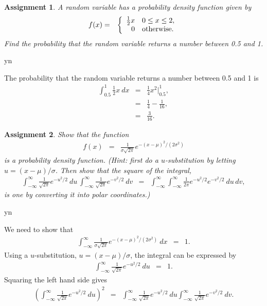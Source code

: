 \documentclass[12pt]{article}
\def\solutions{y}
\def\solutions{n}
\newtheorem{assignment}{Assignment}[section]
\newcommand{\lp}{\left(}
\newcommand{\rp}{\right)}
\begin{document}
\begin{assignment}
  A random variable has a probability density function given by
\begin{eqnarray}
  f(x) & = & \left\{
    \begin{array}{r@{\hspace{1em}}l}
      \frac{1}{2}x  & 0\leq x \leq 2, \\
      0 & \mathrm{otherwise}. 
    \end{array}
    \right.
\end{eqnarray}
Find the probability that the random variable returns a number between
0.5 and 1.
\end{assignment}

\if y\solutions

The probability that the random variable returns a number between 0.5
and 1 is 
\begin{eqnarray*}
  \int^1_{0.5} \frac{1}{2} x ~ dx & = & \frac{1}{4} x^2 \bigg|^1_{0.5}, \\
  & = & \frac{1}{4} - \frac{1}{16}, \\
  & = & \frac{3}{16}.
\end{eqnarray*}

\fi


\begin{assignment}
  Show that the function 
  \begin{eqnarray*}
    f(x) & = & \frac{1}{\sigma\sqrt{2\pi}} e^{-(x-\mu)^2/(2\sigma^2)}
  \end{eqnarray*}
  is a probability density function. (Hint: first do a
  $u$-substitution by letting $u=(x-\mu)/\sigma$. Then show that the
  square of the integral,
  \begin{eqnarray*}
    \int^\infty_{-\infty} \frac{1}{\sqrt{2\pi}} e^{-u^2/2} ~ du \, 
    \int^\infty_{-\infty} \frac{1}{\sqrt{2\pi}} e^{-v^2/2} ~  dv & = & 
    \int^\infty_{-\infty} \int^\infty_{-\infty} \frac{1}{2\pi}
    e^{-u^2/2}e^{-v^2/2} ~ du \, dv,
  \end{eqnarray*}
  is one by converting it into polar coordinates.)
\end{assignment}

\if y\solutions

We need to show that 
\begin{eqnarray*}
  \int^\infty_{-\infty} \frac{1}{\sigma\sqrt{2\pi}}
  e^{-(x-\mu)^2/(2\sigma^2)} ~ dx & = & 1.
\end{eqnarray*}
Using a $u$-substitution, $u=(x-\mu)/\sigma$, the integral can be
expressed by
\begin{eqnarray*}
  \int^\infty_{-\infty} \frac{1}{\sqrt{2\pi}} e^{-u^2/2} ~ du & = & 1.
\end{eqnarray*}
Squaring the left hand side gives
\begin{eqnarray*}
  \lp \int^\infty_{-\infty} \frac{1}{\sqrt{2\pi}} e^{-u^2/2} ~ du \rp^2 
  & = & \int^\infty_{-\infty} \frac{1}{\sqrt{2\pi}} e^{-u^2/2} ~ du 
  \int^\infty_{-\infty} \frac{1}{\sqrt{2\pi}} e^{-v^2/2} ~ dv.
\end{eqnarray*}
\end{document}
